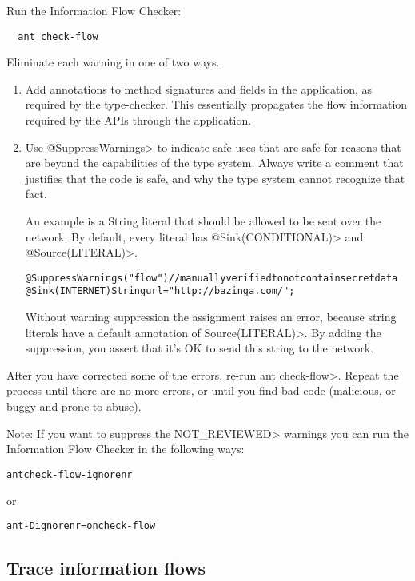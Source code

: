 Run the Information Flow Checker:

\begin{Verbatim}
  ant check-flow
\end{Verbatim}

Eliminate each warning in one of two ways.
\begin{enumerate}
\item Add annotations to method signatures and fields in the application, as
required by the type-checker. This essentially propagates the flow
information required by the APIs through the application.

\item Use \<@SuppressWarnings> to indicate safe uses that are safe for reasons
that are beyond the capabilities of the type system. Always write a
comment that justifies that the code is safe, and why the type system
cannot recognize that fact.

An example is a String literal that should be allowed to be sent
over the network. By default, every literal has \<@Sink(CONDITIONAL)> 
and \<@Source(LITERAL)>.

\begin{alltt}
    @SuppressWarnings("flow") // manually verified to not contain secret data
    @Sink(INTERNET) String url = "http://bazinga.com/";
\end{alltt}

Without warning suppression the assignment raises an error, because string literals
have a default annotation of \<Source(LITERAL)>. By adding the suppression, you
assert that it's OK to send this string to the network. 

\end{enumerate}

After you have corrected some of the errors, re-run \<ant check-flow>.
Repeat the process until there are no more errors, or until you find bad
code (malicious, or buggy and prone to abuse).

Note: If you want to suppress the \<NOT\_REVIEWED> warnings you can run the Information Flow Checker
in the following ways:

\begin{alltt}
    ant check-flow-ignorenr
\end{alltt}
or
\begin{alltt}
    ant -Dignorenr=on check-flow
\end{alltt}


\subsection{Trace information flows\label{sec:trace-types}}


